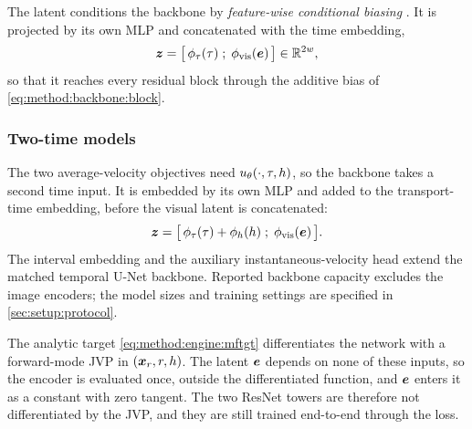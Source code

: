 The latent conditions the backbone by \emph{feature-wise conditional biasing}
\parencite[Sec.~3]{perez2017film}. It is projected by its own MLP and concatenated with the time
embedding,
\begin{equation}\label{eq:method:backbone:concat}
  \boldsymbol{z} = \big[\,\phi_{\tau}(\tau)\;;\;\phi_{\textrm{vis}}(\boldsymbol{e})\,\big] \in \mathbb{R}^{2w},
\end{equation}
so that it reaches every residual block through the additive bias of
\eqref{eq:method:backbone:block}.

\subsubsection*{Two-time models}

The two average-velocity objectives need $u_{\theta}(\cdot,\tau,h)$, so the backbone takes a
second time input. It is embedded by its own MLP and added to the transport-time embedding, before
the visual latent is concatenated:
\begin{equation}\label{eq:method:backbone:twotime}
  \boldsymbol{z} = \big[\,\phi_{\tau}(\tau) + \phi_{h}(h)\;;\;\phi_{\textrm{vis}}(\boldsymbol{e})\,\big].
\end{equation}
The interval embedding and the auxiliary instantaneous-velocity head extend the matched temporal
U-Net backbone. Reported backbone capacity excludes the image encoders; the model sizes and training
settings are specified in \autoref{sec:setup:protocol}.

The analytic target \eqref{eq:method:engine:mftgt} differentiates the network with a forward-mode
\ac{JVP} in $(\boldsymbol{x}_{r},r,h)$. The latent $\boldsymbol{e}$ depends on none of these inputs, so the encoder
is evaluated once, outside the differentiated function, and $\boldsymbol{e}$ enters it as a constant with
zero tangent. The two ResNet towers are therefore not differentiated by the \ac{JVP}, and they are
still trained end-to-end through the loss.

